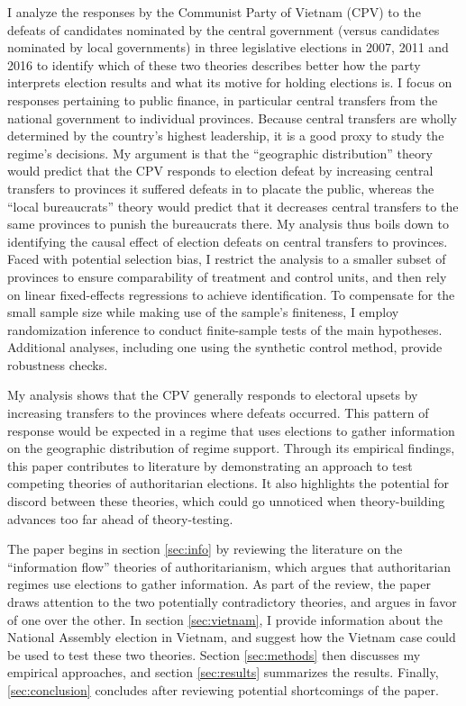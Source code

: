 \documentclass[12pt]{article}\usepackage[]{graphicx}\usepackage[]{color}
\newcommand{\1}{\mathbbm{1}}
\begin{document}
I analyze the responses by the Communist Party of Vietnam (CPV) to the defeats of candidates nominated by the central government (versus candidates nominated by local governments) in three legislative elections in 2007, 2011 and 2016 to identify which of these two theories describes better how the party interprets election results and what its motive for holding elections is. I focus on responses pertaining to public finance, in particular central transfers from the national government to individual provinces. Because central transfers are wholly determined by the country's highest leadership, it is a good proxy to study the regime's decisions. My argument is that the ``geographic distribution'' theory would predict that the CPV responds to election defeat by increasing central transfers to provinces it suffered defeats in to placate the public, whereas the ``local bureaucrats'' theory would predict that it decreases central transfers to the same provinces to punish the bureaucrats there. My analysis thus boils down to identifying the causal effect of election defeats on central transfers to provinces. Faced with potential selection bias, I restrict the analysis to a smaller subset of provinces to ensure comparability of treatment and control units, and then rely on linear fixed-effects regressions to achieve identification. To compensate for the small sample size while making use of the sample's finiteness, I employ randomization inference to conduct finite-sample tests of the main hypotheses. Additional analyses, including one using the synthetic control method, provide robustness checks.


My analysis shows that the CPV generally responds to electoral upsets by increasing transfers to the provinces where defeats occurred. This pattern of response would be expected in a regime that uses elections to gather information on the geographic distribution of regime support. Through its empirical findings, this paper contributes to literature by demonstrating an approach to test competing theories of authoritarian elections. It also highlights the potential for discord between these theories, which could go unnoticed when theory-building advances too far ahead of theory-testing. 

The paper begins in section \ref{sec:info} by reviewing the literature on the ``information flow'' theories of authoritarianism, which argues that authoritarian regimes use elections to gather information. As part of the review, the paper draws attention to the two potentially contradictory theories, and argues in favor of one over the other. In section \ref{sec:vietnam}, I provide information about the National Assembly election in Vietnam, and suggest how the Vietnam case could be used to test these two theories. Section \ref{sec:methods} then discusses my empirical approaches, and section \ref{sec:results} summarizes the results. Finally, \ref{sec:conclusion} concludes after reviewing potential shortcomings of the paper.
\end{document}
